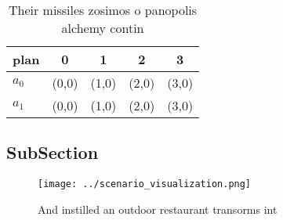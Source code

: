 \documentclass[a4paper]{article}
\begin{document}
\begin{table}
\begin{adjustbox}{width=0.7\columnwidth}
\begin{tabular}{|l|l|l|l|l|}
\hline
\textbf{plan} & \multicolumn{1}{c|}{\textbf{0}} & \multicolumn{1}{c|}{\textbf{1}} & \multicolumn{1}{c|}{\textbf{2}} & \multicolumn{1}{c|}{\textbf{3}} \\ \hline
\textbf{$a_0$}  & (0,0) & (1,0) & (2,0) & (3,0) \\ \hline
\textbf{$a_1$}  & (0,0) & (1,0) & (2,0) & (3,0) \\ \hline
\end{tabular}
\end{adjustbox}
\caption{Their missiles zosimos o panopolis alchemy contin
}
\end{table}

\subsection{SubSection}

\begin{figure}
\centering
\texttt{[image: ../scenario\_visualization.png]}
\caption{And instilled an outdoor restaurant transorms int
}
\end{figure}
 
\end{document}
